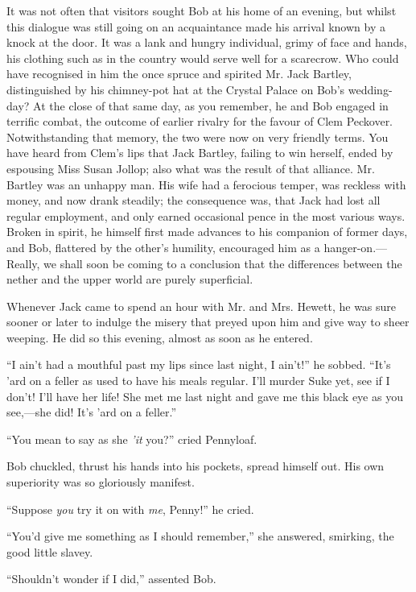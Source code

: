 It was not often that visitors sought Bob at his home of an evening, but
whilst this dialogue was still going on an acquaintance made his arrival
known by a knock at the door. It was a lank and hungry individual, grimy
of face and hands, his clothing such as in the country would serve well
for a {}scarecrow. Who could have recognised in him the once spruce and
spirited Mr. Jack Bartley, distinguished by his chimney-pot hat at the
Crystal Palace on Bob's wedding-day? At the close of that same day, as
you remember, he and Bob engaged in terrific combat, the outcome of
earlier rivalry for the favour of Clem Peckover. Notwithstanding that
memory, the two were now on very friendly terms. You have heard from
Clem's lips that Jack Bartley, failing to win herself, ended by
espousing Miss Susan Jollop; also what was the result of that alliance.
Mr. Bartley was an unhappy man. His wife had a ferocious temper, was
reckless with money, and now drank steadily; the consequence was, that
Jack had lost all regular employment, and only earned occasional pence
in the most various ways. Broken in spirit, he himself first made
advances to his companion of former days, and Bob, flattered by the
other's humility, encouraged him as a hanger-on.---Really, we shall soon
be coming to a conclusion that the differences between the {}nether and
the upper world are purely superficial.

Whenever Jack came to spend an hour with Mr. and Mrs. Hewett, he was
sure sooner or later to indulge the misery that preyed upon him and give
way to sheer weeping. He did so this evening, almost as soon as he
entered.

``I ain't had a mouthful past my lips since last night, I ain't!'' he
sobbed. ``It's 'ard on a feller as used to have his meals regular. I'll
murder Suke yet, see if I don't! I'll have her life! She met me last
night and gave me this black eye as you see,---she did! It's 'ard on a
feller.''

``You mean to say as she \emph{'it} you?'' cried Pennyloaf.

Bob chuckled, thrust his hands into his pockets, spread himself out. His
own superiority was so gloriously manifest.

``Suppose \emph{you} try it on with \emph{me}, Penny!'' he cried.

``You'd give me something as I should remember,'' she answered,
smirking, the good little slavey.

{}``Shouldn't wonder if I did,'' assented Bob.

